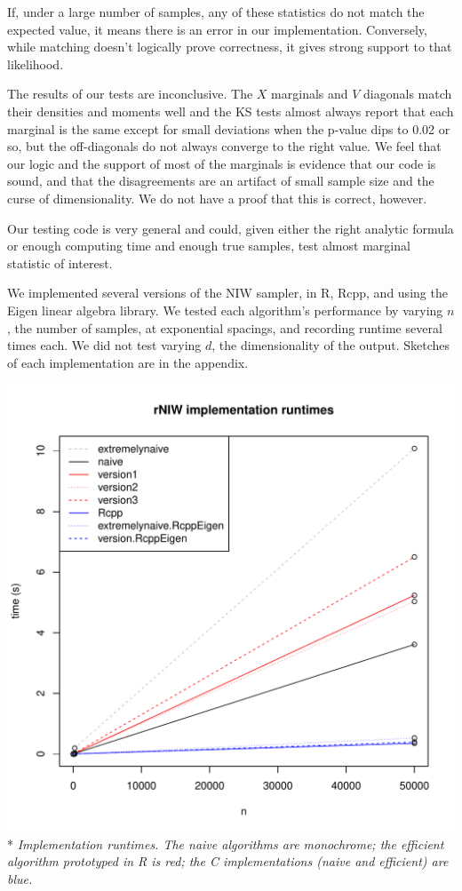 \documentclass[english]{report}
\begin{document}
If, under a large number of samples, any of these statistics do not match the expected value, it means there is an error in our implementation. Conversely, while matching doesn't logically prove correctness, it gives strong support to that likelihood.

The results of our tests are inconclusive. The $X$ marginals and $V$ diagonals match their densities and moments well and the KS tests almost always report that each marginal is the same except for small deviations when the p-value dips to 0.02 or so, but the off-diagonals do not always converge to the right value. We feel that our logic and the support of most of the marginals is evidence that our code is sound, and that the disagreements are an artifact of small sample size and the curse of dimensionality. We do not have a proof that this is correct, however.

Our testing code is very general and could, given either the right analytic formula or enough computing time and enough true samples, test almost marginal statistic of interest.



We implemented several versions of the NIW sampler, in R, Rcpp, and using the Eigen \cite{RcppEigen} linear algebra library. We tested each algorithm's performance by varying $n$, the number of samples, at exponential spacings, and recording runtime several times each. We did not test varying $d$, the dimensionality of the output. Sketches of each implementation are in the appendix.

\includegraphics[scale=.7]{runtimes.pdf}\\*
\emph{Implementation runtimes. The naive algorithms are monochrome; the efficient algorithm prototyped in R is red; the C implementations (naive and efficient) are blue.}
\end{document}
